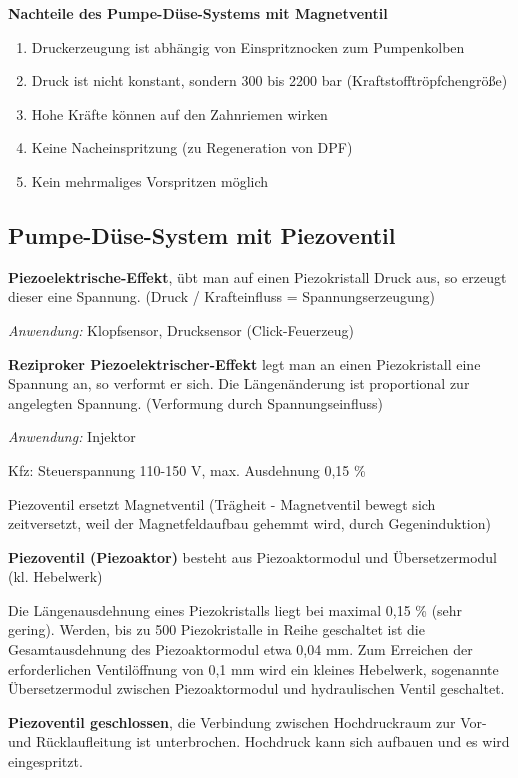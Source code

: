 \textbf{Nachteile des Pumpe-Düse-Systems mit Magnetventil}

\begin{enumerate}
\item
  Druckerzeugung ist abhängig von Einspritznocken zum Pumpenkolben
\item
  Druck ist nicht konstant, sondern 300 bis 2200 bar
  (Kraftstofftröpfchengröße)
\item
  Hohe Kräfte können auf den Zahnriemen wirken
\item
  Keine Nacheinspritzung (zu Regeneration von DPF)
\item
  Kein mehrmaliges Vorspritzen möglich
\end{enumerate}

\subsection{Pumpe-Düse-System mit
Piezoventil}\label{pumpe-duese-system-mit-piezoventil}

\textbf{Piezoelektrische-Effekt}, übt man auf einen Piezokristall Druck
aus, so erzeugt dieser eine Spannung. (Druck / Krafteinfluss =
Spannungserzeugung)

\emph{Anwendung:} Klopfsensor, Drucksensor (Click-Feuerzeug)

\textbf{Reziproker Piezoelektrischer-Effekt} legt man an einen
Piezokristall eine Spannung an, so verformt er sich. Die Längenänderung
ist proportional zur angelegten Spannung. (Verformung durch
Spannungseinfluss)

\emph{Anwendung:} Injektor

Kfz: Steuerspannung 110-150 V, max. Ausdehnung 0,15 \%

Piezoventil ersetzt Magnetventil (Trägheit - Magnetventil bewegt sich
zeitversetzt, weil der Magnetfeldaufbau gehemmt wird, durch
Gegeninduktion)

\textbf{Piezoventil (Piezoaktor)} besteht aus Piezoaktormodul und
Übersetzermodul (kl. Hebelwerk)

Die Längenausdehnung eines Piezokristalls liegt bei maximal 0,15 \%
(sehr gering). Werden, bis zu 500 Piezokristalle in Reihe geschaltet ist
die Gesamtausdehnung des Piezoaktormodul etwa 0,04 mm. Zum Erreichen der
erforderlichen Ventilöffnung von 0,1 mm wird ein kleines Hebelwerk,
sogenannte Übersetzermodul zwischen Piezoaktormodul und hydraulischen
Ventil geschaltet.

\textbf{Piezoventil geschlossen}, die Verbindung zwischen Hochdruckraum
zur Vor- und Rücklaufleitung ist unterbrochen. Hochdruck kann sich
aufbauen und es wird eingespritzt.

